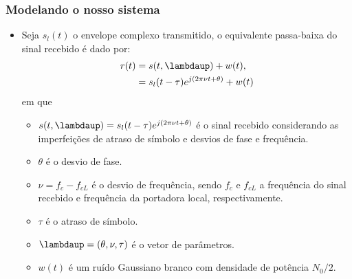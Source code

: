 \begin{frame}[t]
	\frametitle{Modelando o nosso sistema}
	\begin{itemize}		
	
		\item Seja \(s_l (t)\) o envelope complexo transmitido, o equivalente passa-baixa do sinal recebido é dado por:
		\begin{align}
            r(t) & = s(t, \boldsymbol{\lambdaup}) + w(t), \nonumber \\
                 & = s_l (t-\tau) e^{j(2\pi \nu t + \theta)} + w(t)
            \label{eq:r_t}
        \end{align}
        em que
        \begin{itemize}
            \item \(s(t, \boldsymbol{\lambdaup}) = s_l (t-\tau) e^{j(2\pi \nu t + \theta)}\) é o sinal recebido considerando as imperfeições de atraso de símbolo e desvios de fase e frequência.
            \item \(\theta\) é o desvio de fase.
            \item \(\nu = f_c - f_{cL}\) é o desvio de frequência, sendo \(f_c\) e \(f_{cL}\) a frequência do sinal recebido e frequência da portadora local, respectivamente.
            \item \(\tau\) é o atraso de símbolo.
            \item \(\boldsymbol{\lambdaup} = (\theta, \nu, \tau)\) é o vetor de parâmetros.
            \item \(w(t)\) é um ruído Gaussiano branco com densidade de potência \(N_0/2\).
        \end{itemize}
	\end{itemize}
	
\end{frame}

